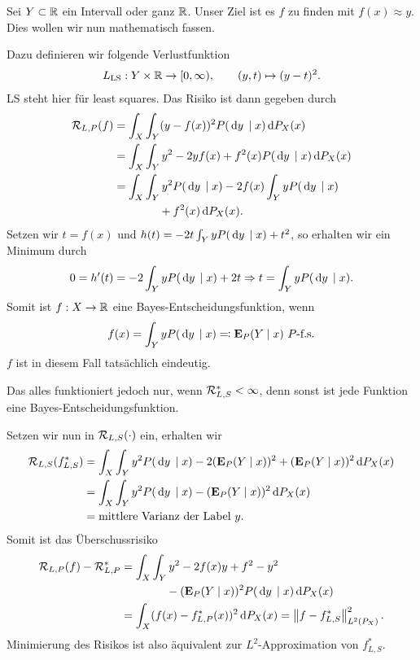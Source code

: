 \begin{bsp*}
\newcommand{\LS}{\mathrm{LS}}
Sei $Y\subset\mathbb{R}$ ein Intervall oder ganz $\mathbb{R}$. Unser Ziel ist es $f$ zu finden
mit $f(x)\approx y$. Dies wollen wir nun mathematisch fassen.

Dazu definieren wir folgende Verlustfunktion
\begin{align*}
L_\LS : Y\times \R\to [0,\infty),\qquad (y,t)\mapsto (y-t)^2.
\end{align*}
LS steht hier für least squares. Das Risiko ist dann gegeben durch
\begin{align*}
\mathcal{R}_{L,P}(f) &= \int_X\int_Y (y-f(x))^2 P(\,\mathrm{d} y\,\mid x)\,\mathrm{d} P_X(x)\\
&= \int_X \int_Y y^2-2yf(x) + f^2(x) P(\,\mathrm{d} y\,\mid x)\,\mathrm{d} P_X(x)\\
&= \int_X \int_Y y^2P(\,\mathrm{d} y\,\mid x) - 2 f(x)\int_Y yP(\,\mathrm{d} y\,\mid x)\\
&\qquad\qquad+ f^2(x)\,\mathrm{d} P_X(x).
\end{align*}
Setzen wir $t=f(x)$ und $h(t) = -2t \int_Y y P(\,\mathrm{d} y\,\mid x) + t^2$, so erhalten
wir ein Minimum durch
\begin{align*}
0 = h'(t) = -2\int_Y yP(\,\mathrm{d} y\,\mid x) + 2t \Rightarrow t = \int_Y yP(\,\mathrm{d} y\,\mid x).
\end{align*}
Somit ist $f: X\to\mathbb{R}$ eine Bayes-Entscheidungsfunktion, wenn
\begin{align*}
f(x) = \int_Y yP(\,\mathrm{d} y\,\mid x) \eqcolon \textbf{E}_P(Y\mid x) \ P\text{-f.s.}
\end{align*}
$f$ ist in diesem Fall tatsächlich eindeutig.

Das alles funktioniert jedoch nur, wenn $\mathcal{R}_{L,S}^* < \infty$, denn sonst ist
jede Funktion eine Bayes-Entscheidungsfunktion.

Setzen wir nun in $\mathcal{R}_{L,S}(\cdot)$ ein, erhalten wir
\begin{align*}
\mathcal{R}_{L,S}(f^*_{L,S}) &=
\int_X \int_Y y^2P(\,\mathrm{d} y\,\mid x) - 2(\textbf{E}_P(Y\mid x))^2 + (\textbf{E}_P(Y\mid x))^2\,\mathrm{d} P_X(x)\\
&= 
\int_X \int_Y y^2P(\,\mathrm{d} y\,\mid x) - (\textbf{E}_P(Y\mid x))^2\,\mathrm{d} P_X(x)\\
&= \text{mittlere Varianz der Label }y.
\end{align*}
Somit ist das Überschussrisiko
\begin{align*}
\mathcal{R}_{L,P}(f) - \mathcal{R}_{L,P}^* &=
\int_X\int_Y y^2 - 2f(x)y + f^2 - y^2 \\ &\qquad\qquad - (\textbf{E}_P(Y\mid x))^2
P(\,\mathrm{d} y\,\mid x) \,\mathrm{d} P_X(x)\\
&= \int_X (f(x)-f^*_{L,P}(x))^2\,\mathrm{d} P_X(x) = \left\|f-f_{L,S}^*\right\|_{L^2(P_X)}^2.
\end{align*}
Minimierung des Risikos ist also äquivalent zur $L^2$-Approximation von
$f^*_{L,S}$.\bsphere
\end{bsp*}

